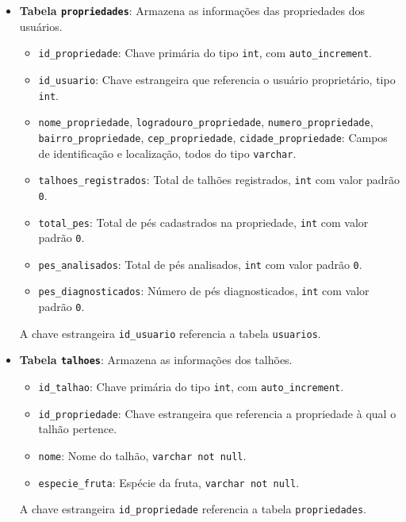 \begin{itemize}
    \item \textbf{Tabela \texttt{propriedades}}: Armazena as informações das propriedades dos usuários.
    \begin{itemize}
        \item \texttt{id\_propriedade}: Chave primária do tipo \texttt{int}, com \texttt{auto\_increment}.
        \item \texttt{id\_usuario}: Chave estrangeira que referencia o usuário proprietário, tipo \texttt{int}.
        \item \texttt{nome\_propriedade}, \texttt{logradouro\_propriedade}, \texttt{numero\_propriedade}, \texttt{bairro\_propriedade}, \texttt{cep\_propriedade}, \texttt{cidade\_propriedade}: Campos de identificação e localização, todos do tipo \texttt{varchar}.
        \item \texttt{talhoes\_registrados}: Total de talhões registrados, \texttt{int} com valor padrão \texttt{0}.
        \item \texttt{total\_pes}: Total de pés cadastrados na propriedade, \texttt{int} com valor padrão \texttt{0}.
        \item \texttt{pes\_analisados}: Total de pés analisados, \texttt{int} com valor padrão \texttt{0}.
        \item \texttt{pes\_diagnosticados}: Número de pés diagnosticados, \texttt{int} com valor padrão \texttt{0}.
    \end{itemize}
    A chave estrangeira \texttt{id\_usuario} referencia a tabela \texttt{usuarios}.

    \item \textbf{Tabela \texttt{talhoes}}: Armazena as informações dos talhões.
    \begin{itemize}
        \item \texttt{id\_talhao}: Chave primária do tipo \texttt{int}, com \texttt{auto\_increment}.
        \item \texttt{id\_propriedade}: Chave estrangeira que referencia a propriedade à qual o talhão pertence.
        \item \texttt{nome}: Nome do talhão, \texttt{varchar not null}.
        \item \texttt{especie\_fruta}: Espécie da fruta, \texttt{varchar not null}.
    \end{itemize}
    A chave estrangeira \texttt{id\_propriedade} referencia a tabela \texttt{propriedades}.


\end{itemize}
